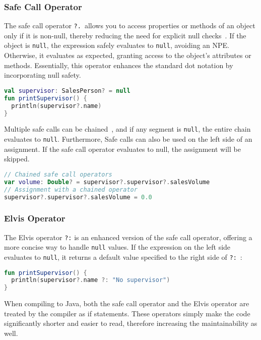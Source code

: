 \documentclass[a4paper,11pt]{article}
\begin{document}
\subsubsection{Safe Call Operator}
The safe call operator \texttt{?.}\ allows you to access properties or methods of an object only if it is non-null, thereby reducing the need for explicit null checks~\cite{nullsafety-safe-call}.
If the object is \texttt{null}, the expression safely evaluates to \texttt{null}, avoiding an NPE\@.
Otherwise, it evaluates as expected, granting access to the object's attributes or methods.
Essentially, this operator enhances the standard dot notation by incorporating null safety. 

\begin{lstlisting}[language=Kotlin]
val supervisor: SalesPerson? = null
fun printSupervisor() {
  println(supervisor?.name)
}
\end{lstlisting}

Multiple safe calls can be chained~\cite{nullsafety-safe-call}, and if any segment is \texttt{null}, the entire chain evaluates to \texttt{null}.
Furthermore, Safe calls can also be used on the left side of an assignment. If the safe call operator evaluates to null, the assignment will be skipped.

\begin{lstlisting}[language=Kotlin]
// Chained safe call operators
var volume: Double? = supervisor?.supervisor?.salesVolume
// Assignment with a chained operator
supervisor?.supervisor?.salesVolume = 0.0
\end{lstlisting}

\subsubsection{Elvis Operator}
The Elvis operator \texttt{?:} is an enhanced version of the safe call operator, offering a more concise way to handle \texttt{null} values. If the expression on the left side evaluates to \texttt{null}, it returns a default value specified to the right side of \texttt{?:}~\cite{nullsafety-elvis}:

\begin{lstlisting}[language=Kotlin]
fun printSupervisor() {
  println(supervisor?.name ?: "No supervisor")
}
\end{lstlisting}

When compiling to Java, both the safe call operator and the Elvis operator are treated by the compiler as if statements. These operators simply make the code significantly shorter and easier to read, therefore increasing the maintainability as well.
\end{document}
